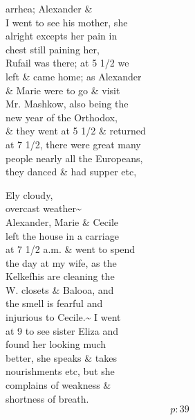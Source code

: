 \documentclass{report}
\begin{document}

	\par{
 	arrhea; Alexander \&\ \\I went to see his mother, she\ \\alright excepts her pain in\ \\chest still paining her,\ \\Rufail was there; at 5 1/2 we\ \\left \& came home; as Alexander\ \\\& Marie were to go \& visit\ \\Mr. Mashkow, also being the\ \\new year of the Orthodox,\ \\\& they went at 5 1/2 \& returned\ \\at 7 1/2, there were great many\ \\people nearly all the Europeans,\ \\they danced \& had supper etc,\ \\
	}


	\par{
 	Ely cloudy,\ \\overcast weather\~{}\ \\Alexander, Marie \& Cecile\ \\left the house in a carriage\ \\at 7 1/2 a.m. \& went to spend\ \\the day at my wife, as the\ \\Kelkefhis are cleaning the\ \\W. closets \& Balooa, and\ \\the smell is fearful and\ \\injurious to Cecile.\~{} I went\ \\at 9 to see sister Eliza and\ \\found her looking much\ \\better, she speaks \& takes\ \\nourishments etc, but she\ \\complains of weakness \&\ \\shortness of breath.\ \\
  \[p: 39 \]

	}


\end{document}
